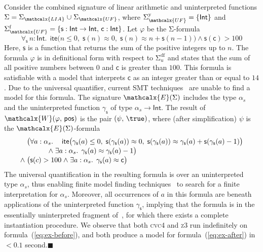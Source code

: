 \documentclass[runningheads,a4paper]{llncs}
\newcommand\xend{{\hfill$\scriptstyle\blacksquare$}}
\newcommand{\con}[1]{\mathsf{#1}}
\let\const=\con
\let\oldSigma=\Sigma
\def\Sigma{\mathrm{\oldSigma}}
\let\oldwedge=\wedge
\def\wedge{\mathrel{\oldwedge}}
\newcommand{\cvc}{\textsc{cvc}{\small 4}\xspace}
\newcommand{\ziii}{\textsc{z}{\small 3}\xspace}
\newcommand{\teq}{\approx}
\newcommand{\conv}{\mathcalx{W}}
\newcommand{\ssorts}[1]{#1^\mathrm{y}}
\newcommand{\sfuns}[1]{#1^\mathrm{f}}
\newcommand{\sfundefs}[1]{#1^\mathrm{df}}
\newcommand{\sortint}{\ty{Int}}
\newcommand{\ptrue}{\con{pos}}
\newcommand\ty[1]{\con{#1}}
\newcommand{\lite}{\con{ite}}
\newcommand\concret{\gamma} %
\newcommand{\forallf}[1]{\forall_{\!#1\:}}
\newcommand{\farg}[1]{\concret_{#1}}
\newcommand{\fargsort}[1]{\alpha_{#1}}
\newcommand{\Sigmalia}{\Sigma_{\mathcalx{LIA}}}
\newcommand{\extendsig}[1]{\mathcalx{E}( #1 )}
\newcommand{\euf}{\ensuremath{\mathcalx{UF}}\xspace}
\begin{document}
\begin{example}
\label{ex:translation}
Consider the combined signature of linear arithmetic and uninterpreted
functions $\Sigma = \Sigmalia \mathrel{\cup} \Sigma_{\euf}$, where
$\ssorts{\Sigma_{\euf}} = \{ \sortint \}$ and
$\sfuns{\Sigma_{\euf}} = \{ \con{s} : { \sortint \rightarrow \sortint },\, \const{c} : { \sortint } \}$.
Let $\varphi$ be the $\Sigma$-formula
\begin{equation} \label{eq:ex-before}
\forallf{\con{s}} n : {\sortint}.\;\, \lite\bigl( n \leq 0,\; \con{s}(n) \teq 0,\;
  \con{s}( n ) \teq n + \con{s}( n - 1 ) \bigr) \wedge \con{s}( \con{c} ) > 100
\end{equation} 
%
Here, $\const{s}$ is a function that returns the sum of the positive integers
up to $n$. The formula $\varphi$ is in definitional form with
respect to $\sfundefs{\Sigma_u}$ and states that the sum of all
positive numbers between $0$ and $\const{c}$ is greater than $100$. This formula is
satisfiable with a model that interprets $\const{c}$ as an integer greater than or
equal to $14$. Due to the universal quantifier,
current SMT techniques~\cite{GeDeM-CAV-09, ReyEtAl-1-RR-13} are unable to find
a model for this formula. The signature $\extendsig{\Sigma}$ includes the type
$\fargsort{s}$ and the uninterpreted function $\farg{\con{s}}$ of type $\fargsort{s}
\rightarrow \sortint$. The result of $\conv( \varphi,\, \ptrue )$ is the pair $(
\psi,\, \true )$, where (after simplification) $\psi$ is the
$\extendsig{\Sigma}$-formula
%
\begin{equation} \label{eq:ex-after}
\!\begin{aligned}[c]
  & \phantom{{\wedge}\; }\bigl(
    \!\begin{aligned}[t]
      \forall a : \fargsort{s}.\; & \phantom{{\wedge}\;}\lite\bigl( \farg{\con{s}}( a ) \leq 0,\;
        \con{s}(\farg{\con{s}}( a )) \teq 0,\;
        \con{s}(\farg{\con{s}}( a )) \teq \farg{\con{s}}( a ) + \con{s}( \farg{\con{s}}( a )-1 ) \bigr)
\\[-\jot]
      {\wedge}\; & \exists a : {\fargsort{s}}.\;\, \farg{\con{s}}( a ) \teq \farg{\con{s}}( a )-1 \bigr)
\end{aligned}
\\[-\jot]
 & {\wedge}\; \bigl( \con{s}( c ) > 100 \wedge \exists a : {\fargsort{s}}.\;\, \farg{\con{s}}( a ) \teq \con{c} \bigr)
\end{aligned}
\end{equation}
%
The universal quantification in the resulting formula is over an uninterpreted
type $\fargsort{s}$, thus enabling finite model finding
techniques~\cite{ReyEtAl-1-RR-13} to search for a finite interpretation for
$\fargsort{s}$. Moreover, all occurrences of $a$ in this formula are beneath
applications of the uninterpreted function $\farg{\con{s}}$, implying that the
formula is in the essentially uninterpreted fragment of~\cite{GeDeM-CAV-09},
for which there exists a complete instantiation procedure. We observe that both
\cvc and \ziii run indefinitely on formula~(\ref{eq:ex-before}), and both
produce a model for formula~(\ref{eq:ex-after}) in $<0.1$ second.\xend
\end{example}
\end{document}
